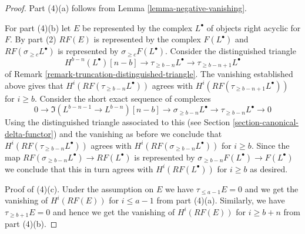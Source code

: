 \begin{proof}
\medskip\noindent
Part (4)(a) follows from Lemma \ref{lemma-negative-vanishing}.

\medskip\noindent
For part (4)(b) let $E$ be represented by the complex $L^\bullet$
of objects right acyclic for $F$. By part (2) $RF(E)$ is represented
by the complex $F(L^\bullet)$ and $RF(\sigma_{\geq c}L^\bullet)$
is represented by $\sigma_{\geq c}F(L^\bullet)$. Consider the
distinguished triangle
$$
H^{b - n}(L^\bullet)[n - b] \to
\tau_{\geq b - n}L^\bullet \to
\tau_{\geq b - n + 1}L^\bullet
$$
of Remark \ref{remark-truncation-distinguished-triangle}.
The vanishing established above gives that
$H^i(RF(\tau_{\geq b - n}L^\bullet))$ agrees with
$H^i(RF(\tau_{\geq b - n + 1}L^\bullet))$ for $i \geq b$.
Consider the short exact sequence of complexes
$$
0 \to
\Im(L^{b - n - 1} \to L^{b - n})[n - b] \to
\sigma_{\geq b - n}L^\bullet \to
\tau_{\geq b - n}L^\bullet \to 0
$$
Using the distinguished triangle associated to this
(see Section \ref{section-canonical-delta-functor})
and the vanishing as before we conclude that
$H^i(RF(\tau_{\geq b - n}L^\bullet))$ agrees with
$H^i(RF(\sigma_{\geq b - n}L^\bullet))$ for $i \geq b$.
Since the map $RF(\sigma_{\geq b - n}L^\bullet) \to RF(L^\bullet)$
is represented by $\sigma_{\geq b - n}F(L^\bullet) \to F(L^\bullet)$
we conclude that this in turn agrees with $H^i(RF(L^\bullet))$
for $i \geq b$ as desired.

\medskip\noindent
Proof of (4)(c). Under the assumption on $E$ we have
$\tau_{\leq a - 1}E = 0$ and we get the vanishing
of $H^i(RF(E))$ for $i \leq a - 1$ from part (4)(a).
Similarly, we have $\tau_{\geq b + 1}E = 0$ and hence
we get the vanishing of $H^i(RF(E))$ for $i \geq b + n$ from
part (4)(b).
\end{proof}

